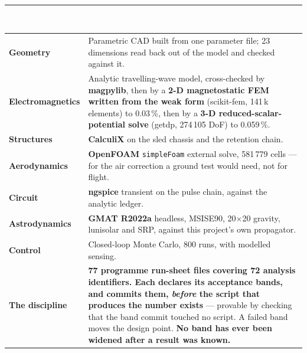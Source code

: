 \documentclass[10pt,a4paper]{article}
\newcommand{\hrulethin}{\textcolor{rule}{\rule{\linewidth}{0.4pt}}}
\newcommand{\shead}[1]{\vspace{1.6mm}{\bfseries\footnotesize\textcolor{ox}{\MakeUppercase{#1}}}\\[0.5mm]\hrulethin\\[1.1mm]}
\newcommand{\gp}{\hspace{4mm}}
\begin{document}
\shead{The method chain}
{\footnotesize
\begin{tabular}{@{}L{30mm}@{\gp}L{\dimexpr\linewidth-34mm\relax}@{}}
\textbf{Geometry} & Parametric CAD built from one parameter file; 23 dimensions read back out of the model and checked against it.\\
\textbf{Electromagnetics} & Analytic travelling-wave model, cross-checked by \textbf{magpylib}, then by a \textbf{2-D magnetostatic FEM written from the weak form} (scikit-fem, 141\,k elements) to 0.03\,\%, then by a \textbf{3-D reduced-scalar-potential solve} (getdp, 274\,105 DoF) to 0.059\,\%.\\
\textbf{Structures} & \textbf{CalculiX} on the sled chassis and the retention chain.\\
\textbf{Aerodynamics} & \textbf{OpenFOAM} \texttt{simpleFoam} external solve, 581\,779 cells --- for the air correction a ground test would need, not for flight.\\
\textbf{Circuit} & \textbf{ngspice} transient on the pulse chain, against the analytic ledger.\\
\textbf{Astrodynamics} & \textbf{GMAT R2022a} headless, MSISE90, 20$\times$20 gravity, lunisolar and SRP, against this project's own propagator.\\
\textbf{Control} & Closed-loop Monte Carlo, 800 runs, with modelled sensing.\\[1.0mm]
\textcolor{ox}{\textbf{The discipline}} & \textcolor{ox}{\textbf{77 programme run-sheet files covering 72 analysis identifiers. Each declares its acceptance bands, and commits them, \emph{before} the script that produces the number exists} --- provable by checking that the band commit touched no script. A failed band moves the design point. \textbf{No band has ever been widened after a result was known.}}\\
\end{tabular}\par}
\end{document}
